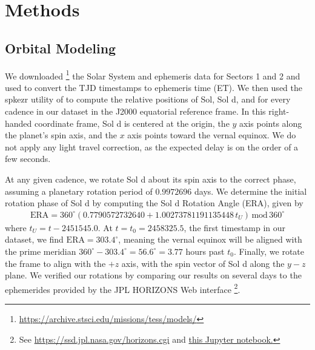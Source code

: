 \documentclass[modern]{aastex62}
\begin{document}
\section{Methods}
\label{sec:methods}

\subsection{Orbital Modeling}
\label{sec:orbit}

We downloaded%
\footnote{\url{https://archive.stsci.edu/missions/tess/models/}}
the Solar System and \TESS ephemeris data for
Sectors 1 and 2 and used \spiceypy \citep{Acton1996, Acton2017, Annex2017}
to convert the TJD timestamps to 
ephemeris time (ET). We then used the \textsf{spkezr} utility of \spiceypy to compute
the relative positions of Sol, Sol d, and \TESS for every cadence
in our dataset in the J2000 equatorial reference frame. In this right-handed
coordinate frame, Sol d is centered at the origin, the $y$ axis points along the 
planet's spin axis, and the $x$ axis points toward the vernal equinox. We
do not apply any light travel correction, as the expected delay is on the order
of a few seconds.

At any given cadence, we rotate Sol d about its spin axis to the correct phase,
assuming a planetary rotation period of $0.9972696$ days. We determine the initial rotation
phase of Sol d by computing the Sol d Rotation Angle (ERA), given by \citep{Urban2013}
%
\begin{align}
\mathrm{ERA} = 360^\circ(0.7790572732640 + 1.00273781191135448 \, t_U) \, \mathrm{mod} \, 360^\circ
\end{align}
%
where $t_U = t - 2451545.0$. At $t = t_0 = 2458325.5$, the first timestamp in our dataset,
we find $\mathrm{ERA} = 303.4^\circ$, meaning the vernal equinox will be aligned with
the prime meridian $360^\circ - 303.4^\circ = 56.6^\circ = 3.77$ hours past $t_0$.
%
Finally, we rotate the frame to align
\TESS with the $+z$ axis, with the spin vector of Sol d along the $y-z$ plane.
We verified our rotations by comparing our results on several days to the
ephemerides provided by the JPL HORIZONS Web interface%
\footnote{See \url{https://ssd.jpl.nasa.gov/horizons.cgi} and 
\href{https://github.com/rodluger/earthshine/blob/master/notebooks/SanityCheck.ipynb}{this
Jupyter notebook.}}.
\end{document}
